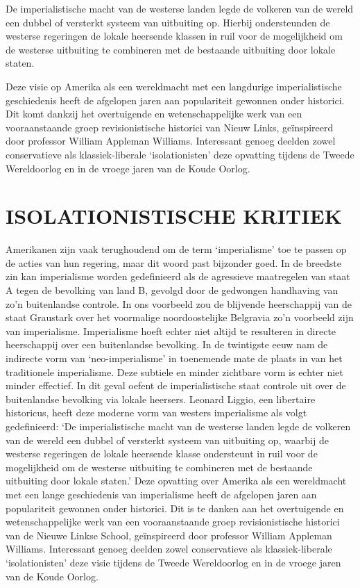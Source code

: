 \documentclass[
  a5paper,
  smalldemyvopaper,10pt,twoside,onecolumn,openright,extrafontsizes,hidelinks]{memoir}
\renewenvironment{quote}%
               {\list{}{\rightmargin=.6cm\leftmargin=.6cm}%
                \itshape \item[]}%
               {\endlist}
\begin{document}
\begin{quote}
De imperialistische macht van de westerse landen legde de volkeren van
de wereld een dubbel of versterkt systeem van uitbuiting op. Hierbij
ondersteunden de westerse regeringen de lokale heersende klassen in ruil
voor de mogelijkheid om de westerse uitbuiting te combineren met de
bestaande uitbuiting door lokale staten.
\end{quote}

Deze visie op Amerika als een wereldmacht met een langdurige
imperialistische geschiedenis heeft de afgelopen jaren aan populariteit
gewonnen onder historici. Dit komt dankzij het overtuigende en
wetenschappelijke werk van een vooraanstaande groep revisionistische
historici van Nieuw Links, geïnspireerd door professor William Appleman
Williams. Interessant genoeg deelden zowel conservatieve als
klassiek-liberale `isolationisten' deze opvatting tijdens de Tweede
Wereldoorlog en in de vroege jaren van de Koude Oorlog.

\section{ISOLATIONISTISCHE KRITIEK}\label{isolationistische-kritiek}

Amerikanen zijn vaak terughoudend om de term `imperialisme' toe te
passen op de acties van hun regering, maar dit woord past bijzonder
goed. In de breedste zin kan imperialisme worden gedefinieerd als de
agressieve maatregelen van staat A tegen de bevolking van land B,
gevolgd door de gedwongen handhaving van zo'n buitenlandse controle. In
ons voorbeeld zou de blijvende heerschappij van de staat Graustark over
het voormalige noordoostelijke Belgravia zo'n voorbeeld zijn van
imperialisme. Imperialisme hoeft echter niet altijd te resulteren in
directe heerschappij over een buitenlandse bevolking. In de twintigste
eeuw nam de indirecte vorm van `neo-imperialisme' in toenemende mate de
plaats in van het traditionele imperialisme. Deze subtiele en minder
zichtbare vorm is echter niet minder effectief. In dit geval oefent de
imperialistische staat controle uit over de buitenlandse bevolking via
lokale heersers. Leonard Liggio, een libertaire historicus, heeft deze
moderne vorm van westers imperialisme als volgt gedefinieerd: `De
imperialistische macht van de westerse landen legde de volkeren van de
wereld een dubbel of versterkt systeem van uitbuiting op, waarbij de
westerse regeringen de lokale heersende klasse ondersteunt in ruil voor
de mogelijkheid om de westerse uitbuiting te combineren met de bestaande
uitbuiting door lokale staten.' Deze opvatting over Amerika als een
wereldmacht met een lange geschiedenis van imperialisme heeft de
afgelopen jaren aan populariteit gewonnen onder historici. Dit is te
danken aan het overtuigende en wetenschappelijke werk van een
vooraanstaande groep revisionistische historici van de Nieuwe Linkse
School, geïnspireerd door professor William Appleman Williams.
Interessant genoeg deelden zowel conservatieve als klassiek-liberale
`isolationisten' deze visie tijdens de Tweede Wereldoorlog en in de
vroege jaren van de Koude Oorlog.
\end{document}
